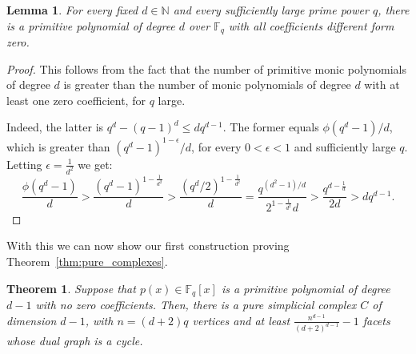 \documentclass[12pt,a4paper]{article}
\newcommand{\F}{\mathbb F}
\newcommand{\N}{\mathbb N}
\theoremstyle{plain}
\newtheorem{theorem}{Theorem}
\newtheorem{lemma}{Lemma}
\theoremstyle{definition}
\begin{document}
\begin{lemma}
  For every fixed $d\in\N$ and every sufficiently large prime power $q$, there is a primitive polynomial of degree $d$ over $\mathbb{F}_q$ with all coefficients different form zero.
\end{lemma}

\begin{proof}
This follows from the fact that the number of primitive monic polynomials of degree $d$ is greater than the number of monic polynomials of degree $d$ with at least one zero coefficient, for $q$ large. 

Indeed, the latter is $q^d-(q-1)^d\leq dq^{d-1}$. The former equals $\phi(q^d-1)/d$, which is greater than $(q^d-1)^{1-\epsilon}/d$, for every $0<\epsilon<1$ and sufficiently large $q$. Letting $\epsilon=\frac{1}{d^2}$ we get:
  \[
    \frac{\phi(q^d-1)}{d}>\frac{(q^d-1)^{1-\frac{1}{d^2}}}{d}>\frac{(q^d/2)^{1-\frac{1}{d^2}}}{d}=\frac{q^{(d^2-1)/d}}{2^{1-\frac{1}{d^2}}d}>\frac{q^{d-\frac{1}{d}}}{2d} >dq^{d-1}.
  \]
\end{proof}

With this we can now show our first construction proving Theorem~\ref{thm:pure_complexes}.

\begin{theorem}
\label{thm:lfsr}
Suppose that $p(x)\in \F_q[x]$ is a primitive polynomial of degree $d-1$ with no zero coefficients. Then, there is a pure simplicial complex $C$ of dimension $d-1$, with $n=(d+2)q$ vertices and at least $\frac{n^{d-1}}{(d+2)^{d-1}}-1$ facets whose dual graph is a cycle.
\end{theorem}
\end{document}
